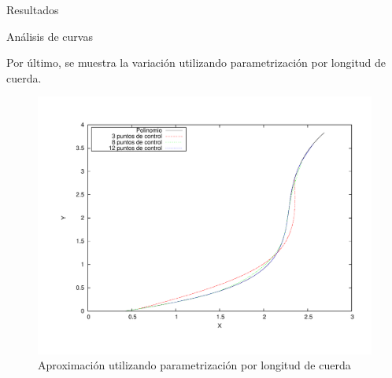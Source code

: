 \begin{section}{Resultados}
\begin{subsection}{Análisis de curvas}
		\VSP

		Por último, se muestra la variación utilizando parametrización por longitud de cuerda.

		\begin{figure}[H]
		  \centering
			\includegraphics[width=14cm]{graficos/chordLength_grafiquinSame.pdf}
		  \caption{Aproximación utilizando parametrización por longitud de cuerda}
		  \label{fig:chordLength}
		\end{figure}
		
		\VSP
	\end{subsection}
\end{section}
